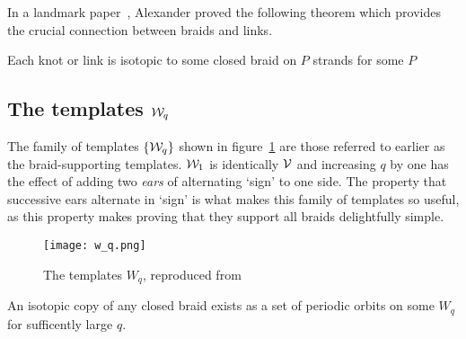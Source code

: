\documentclass[paper.tex]{subfiles}
\begin{document}

In a landmark paper~\cite{Alexander1923}, Alexander proved the following theorem which provides the crucial connection
between braids and links.


\begin{thm}[Alexander 1923]
  Each knot or link is isotopic to some closed braid on $P$ strands for some $P$
\end{thm}

\subsection{The templates $\mathcal{W}_q$}

The family of templates $\{ \mathcal{W}_q \}$ shown in figure~\ref{fig:w_q} are those referred to earlier as the braid-supporting templates. $\mathcal{W}_1$ is identically $\mathcal{V}$ and increasing $q$ by one has the effect of adding
two \emph{ears} of alternating `sign' to one side. The property that successive ears alternate in `sign' is what makes this family of templates so useful, as this property makes proving that they support all braids delightfully simple.

\begin{figure}[h]
  \centering
  \texttt{[image: w\_q.png]}
  \caption{The templates $W_q$, reproduced from~\cite{knottyode}}\label{fig:w_q}
\end{figure}


\begin{lemma}[Ghrist 1996]
  An isotopic copy of any closed braid exists as a set of periodic orbits on some $W_q$ for sufficently large $q$.
\end{lemma}
\end{document}

